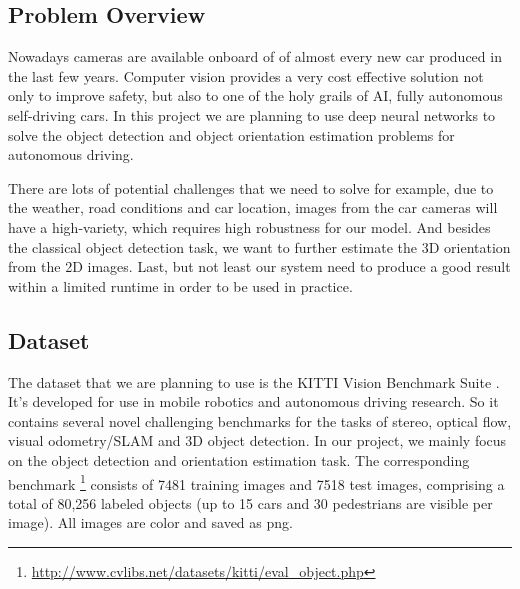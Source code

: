 \subsection{Problem Overview}


Nowadays cameras are available onboard of of almost every new car produced in the last few years. Computer vision provides a very cost effective solution not only to improve safety, but also to one of the holy grails of AI, fully autonomous self-driving cars. 
In this project we are planning to use deep neural networks to solve the object detection and object orientation estimation problems for autonomous driving. 

There are lots of potential challenges that we need to solve for example, 
due to the weather, road conditions and car location, 
images from the car cameras will have a high-variety, which 
requires high robustness for our model. 
And besides the classical object detection task, we 
want to further estimate the 3D orientation from the 2D images.
Last, but not least our 
system need to produce a good result within a limited runtime in order 
to be used in practice.

\subsection{Dataset}
The dataset that we are planning to use is the KITTI Vision Benchmark Suite \cite{Geiger2012CVPR}.  
It's developed for use in mobile robotics and autonomous driving research. So it 
contains several novel challenging benchmarks for the tasks of stereo, optical flow, visual
odometry/SLAM and 3D object detection. 
In our project, we mainly focus on the object detection and orientation estimation task. 
The corresponding benchmark \footnote{\url{http://www.cvlibs.net/datasets/kitti/eval_object.php}} consists of 7481 training images and 7518 test images, comprising a total of 80,256 labeled objects (up to 15 cars and 30 pedestrians are visible per image). All images are color and saved as png.

